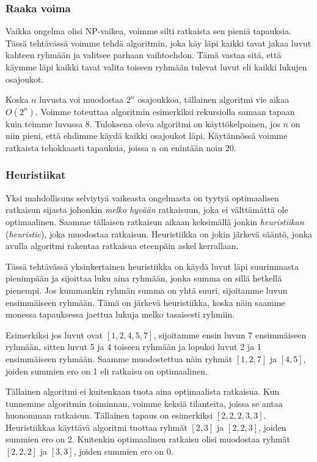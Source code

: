 \subsubsection{Raaka voima}

Vaikka ongelma olisi NP-vaikea, voimme silti ratkaista sen
pieniä tapauksia.
Tässä tehtävässä voimme tehdä algoritmin,
joka käy läpi kaikki tavat jakaa luvut kahteen ryhmään
ja valitsee parhaan vaihtoehdon.
Tämä vastaa sitä, että käymme läpi kaikki tavat valita
toiseen ryhmään tulevat luvut
eli kaikki lukujen osajoukot.

Koska $n$ luvusta voi muodostaa $2^n$ osajoukkoa,
tällainen algoritmi vie aikaa $O(2^n)$.
Voimme toteuttaa algoritmin esimerkiksi rekursiolla
samaan tapaan kuin teimme luvussa 8.
Tuloksena oleva algoritmi on käyttökelpoinen, jos $n$ on niin pieni,
että ehdimme käydä kaikki osajoukot läpi.
Käytännössä voimme ratkaista tehokkaasti tapauksia,
joissa $n$ on enintään noin 20.

\subsubsection{Heuristiikat}


Yksi mahdollisuus selviytyä vaikeasta ongelmasta on tyytyä
optimaalisen ratkaisun sijasta johonkin \emph{melko hyvään} ratkaisuun,
joka ei välttämättä ole optimaalinen.
Saamme tällaisen ratkaisun aikaan keksimällä jonkin
\emph{heuristiikan} (\emph{heuristic}), joka muodostaa ratkaisun.
Heuristiikka on jokin järkevä sääntö, jonka avulla
algoritmi rakentaa ratkaisua eteenpäin askel kerrallaan.

Tässä tehtävässä yksinkertainen heuristiikka on
käydä luvut läpi suurimmasta pienimpään ja sijoittaa
luku aina ryhmään, jonka summa on sillä hetkellä pienempi.
Jos kummankin ryhmän summa on yhtä suuri,
sijoitamme luvun ensimmäiseen ryhmään.
Tämä on järkevä heuristiikka, koska näin saamme monessa tapauksessa
jaettua lukuja melko tasaisesti ryhmiin.

Esimerkiksi jos luvut ovat $[1,2,4,5,7]$, sijoitamme ensin
luvun 7 ensim\-mäiseen ryhmään, sitten luvut 5 ja 4 toiseen ryhmään
ja lopuksi luvut 2 ja 1 ensimmäiseen ryhmään.
Saamme muodostettua näin ryhmät $[1,2,7]$ ja $[4,5]$,
joiden summien ero on 1 eli ratkaisu on optimaalinen.

Tällainen algoritmi ei kuitenkaan tuota aina optimaalista ratkaisua.
Kun tunnemme algoritmin toiminnan, voimme keksiä tilanteita,
joissa se antaa huonomman ratkaisun.
Tällainen tapaus on esimerkiksi $[2,2,2,3,3]$.
Heuristiikkaa käyttävä algoritmi tuottaa ryhmät $[2,3]$ ja $[2,2,3]$,
joiden summien ero on 2.
Kuitenkin optimaalinen ratkaisu olisi muodostaa ryhmät
$[2,2,2]$ ja $[3,3]$, joiden summien ero on 0.

